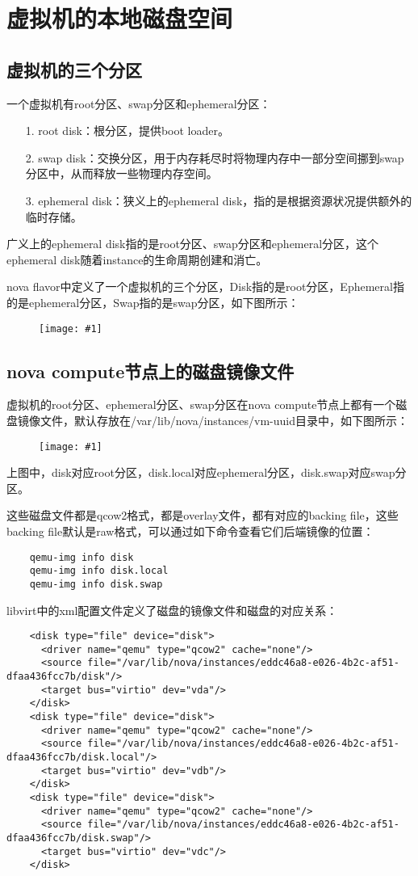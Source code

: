 \documentclass[a4paper,left=1.5cm,right=1.5cm,11pt]{article}
\newcommand{\fic}[1]{\begin{figure}[H]
		\center
		\texttt{[image: \#1]}
	\end{figure}}
\begin{document}
\tableofcontents

\clearpage
\section{虚拟机的本地磁盘空间}
\subsection{虚拟机的三个分区}
    一个虚拟机有root分区、swap分区和ephemeral分区：
    \begin{itemize}
        \item[1.] root disk：根分区，提供boot loader。
        \item[2.] swap disk：交换分区，用于内存耗尽时将物理内存中一部分空间挪到swap分区中，从而释放一些物理内存空间。
        \item[3.] ephemeral disk：狭义上的ephemeral disk，指的是根据资源状况提供额外的临时存储。
    \end{itemize}

    广义上的ephemeral disk指的是root分区、swap分区和ephemeral分区，这个ephemeral disk随着instance的生命周期创建和消亡。\par

    nova flavor中定义了一个虚拟机的三个分区，Disk指的是root分区，Ephemeral指的是ephemeral分区，Swap指的是swap分区，如下图所示：
    \fic{1.png}

\subsection{nova compute节点上的磁盘镜像文件}
    虚拟机的root分区、ephemeral分区、swap分区在nova compute节点上都有一个磁盘镜像文件，默认存放在/var/lib/nova/instances/vm-uuid目录中，如下图所示：
    \fic{2.png}

    上图中，disk对应root分区，disk.local对应ephemeral分区，disk.swap对应swap分区。\par

    这些磁盘文件都是qcow2格式，都是overlay文件，都有对应的backing file，这些backing file默认是raw格式，可以通过如下命令查看它们后端镜像的位置：
    \begin{lstlisting}
    qemu-img info disk
    qemu-img info disk.local
    qemu-img info disk.swap
    \end{lstlisting}

    libvirt中的xml配置文件定义了磁盘的镜像文件和磁盘的对应关系：
    \begin{lstlisting}
    <disk type="file" device="disk">
      <driver name="qemu" type="qcow2" cache="none"/>
      <source file="/var/lib/nova/instances/eddc46a8-e026-4b2c-af51-dfaa436fcc7b/disk"/>
      <target bus="virtio" dev="vda"/>
    </disk>
    <disk type="file" device="disk">
      <driver name="qemu" type="qcow2" cache="none"/>
      <source file="/var/lib/nova/instances/eddc46a8-e026-4b2c-af51-dfaa436fcc7b/disk.local"/>
      <target bus="virtio" dev="vdb"/>
    </disk>
    <disk type="file" device="disk">
      <driver name="qemu" type="qcow2" cache="none"/>
      <source file="/var/lib/nova/instances/eddc46a8-e026-4b2c-af51-dfaa436fcc7b/disk.swap"/>
      <target bus="virtio" dev="vdc"/>
    </disk>
    \end{lstlisting}
\end{document}
